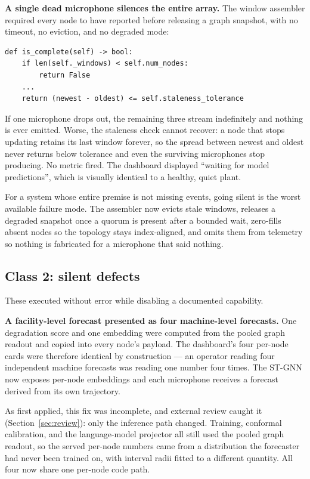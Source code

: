 \documentclass[11pt]{article}
\begin{document}
\textbf{A single dead microphone silences the entire array.} The window
assembler required every node to have reported before releasing a graph
snapshot, with no timeout, no eviction, and no degraded mode:

\begin{lstlisting}
def is_complete(self) -> bool:
    if len(self._windows) < self.num_nodes:
        return False
    ...
    return (newest - oldest) <= self.staleness_tolerance
\end{lstlisting}

If one microphone drops out, the remaining three stream indefinitely and nothing
is ever emitted. Worse, the staleness check cannot recover: a node that stops
updating retains its last window forever, so the spread between newest and
oldest never returns below tolerance and even the surviving microphones stop
producing. No metric fired. The dashboard displayed ``waiting for model
predictions'', which is visually identical to a healthy, quiet plant.

For a system whose entire premise is not missing events, going silent is the
worst available failure mode. The assembler now evicts stale windows, releases a
degraded snapshot once a quorum is present after a bounded wait, zero-fills
absent nodes so the topology stays index-aligned, and omits them from telemetry
so nothing is fabricated for a microphone that said nothing.

\subsection{Class 2: silent defects}

These executed without error while disabling a documented capability.

\textbf{A facility-level forecast presented as four machine-level forecasts.}
One degradation score and one embedding were computed from the pooled graph
readout and copied into every node's payload. The dashboard's four per-node
cards were therefore identical by construction --- an operator reading four
independent machine forecasts was reading one number four times. The ST-GNN now
exposes per-node embeddings and each microphone receives a forecast derived from
its own trajectory.

As first applied, this fix was incomplete, and external review caught it
(Section~\ref{sec:review}): only the inference path changed. Training, conformal
calibration, and the language-model projector all still used the pooled graph
readout, so the served per-node numbers came from a distribution the forecaster
had never been trained on, with interval radii fitted to a different quantity.
All four now share one per-node code path.
\end{document}

